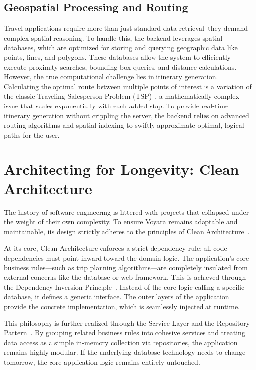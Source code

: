 \subsection{Geospatial Processing and Routing}
Travel applications require more than just standard data retrieval; they demand complex spatial reasoning. To handle this, the backend leverages spatial databases, which are optimized for storing and querying geographic data like points, lines, and polygons. These databases allow the system to efficiently execute proximity searches, bounding box queries, and distance calculations. However, the true computational challenge lies in itinerary generation. Calculating the optimal route between multiple points of interest is a variation of the classic Traveling Salesperson Problem (TSP)~\cite{tsp}, a mathematically complex issue that scales exponentially with each added stop. To provide real-time itinerary generation without crippling the server, the backend relies on advanced routing algorithms and spatial indexing to swiftly approximate optimal, logical paths for the user.

\section{Architecting for Longevity: Clean Architecture}
The history of software engineering is littered with projects that collapsed under the weight of their own complexity. To ensure Voyara remains adaptable and maintainable, its design strictly adheres to the principles of Clean Architecture~\cite{clean_architecture}. 

At its core, Clean Architecture enforces a strict dependency rule: all code dependencies must point inward toward the domain logic. The application's core business rules—such as trip planning algorithms—are completely insulated from external concerns like the database or web framework. This is achieved through the Dependency Inversion Principle~\cite{dip}. Instead of the core logic calling a specific database, it defines a generic interface. The outer layers of the application provide the concrete implementation, which is seamlessly injected at runtime.

This philosophy is further realized through the Service Layer and the Repository Pattern~\cite{poeaa}. By grouping related business rules into cohesive services and treating data access as a simple in-memory collection via repositories, the application remains highly modular. If the underlying database technology needs to change tomorrow, the core application logic remains entirely untouched.

